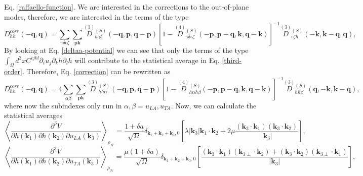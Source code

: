 Eq. \ref{raffaello-function}. We are interested in the corrections to the out-of-plane modes, therefore, we are
interested in the terms of the type
\begin{equation}
D_{hh}^{corr}(-\boldsymbol{q},\boldsymbol{q})=\sum_{\gamma\delta\epsilon\zeta}\sum_{\boldsymbol{p}\boldsymbol{k}}\overset{(3)}{D}{}^{(S)}_{h\gamma\delta}(-\boldsymbol{q},\boldsymbol{p},
\boldsymbol{q}-\boldsymbol{p})[1-\overset{(4)}{D}{}^{(S)}_{\gamma\delta\epsilon\zeta}(-\boldsymbol{p},\boldsymbol{p}-\boldsymbol{q},\boldsymbol{k},\boldsymbol{q}-\boldsymbol{k})]^{-1}\overset{(3)}{D}{}^{(S)}_{
 \epsilon\zeta h}(-\boldsymbol{k},\boldsymbol{k}-\boldsymbol{q},\boldsymbol{q}),
\end{equation}
By looking at Eq. \ref{deltaa-potential} we can see that only the terms of the type $\int_{\Omega}{d^{2}xC^{ijkl}\partial_{i}u_{j}\partial_{k}h\partial_{l}h}$ will contribute to the statistical average in
Eq. \ref{third-order}. Therefore, Eq. \ref{correction} can be rewritten as
\begin{equation}
\label{correction-simple}
D_{hh}^{corr}(-\boldsymbol{q},\boldsymbol{q})=4\sum_{\alpha\beta}\sum_{\boldsymbol{p}\boldsymbol{k}}\overset{(3)}{D}{}^{(S)}_{hh\alpha}(-\boldsymbol{q},\boldsymbol{p},\boldsymbol{q}-\boldsymbol{p})[
1-\overset{(4)}{D}{}^{(S)}_{h\alpha h\beta}(-\boldsymbol{p},\boldsymbol{p}-\boldsymbol{q},\boldsymbol{k},\boldsymbol{q}-\boldsymbol{k})]^{-1}\overset{(3)}{D}{}^{(S)}_{hh\beta}(\boldsymbol{q},-\boldsymbol{k},\boldsymbol{k}-\boldsymbol{q}),
\end{equation}
where now the subindexes only run in $\alpha,\beta=u_{LA},u_{TA}$. Now, we can calculate the statistical averages
\begin{equation}
	\left\langle\frac{\partial^{3}V}{\partial h(\boldsymbol{k}_{1})\partial h(\boldsymbol{k}_{2})\partial u_{LA}(\boldsymbol{k}_{3})}\right\rangle_{\rho_{\mathcal{H}}}=\frac{1+\delta a}{\sqrt{\Omega}}\delta_{\boldsymbol{k}_{1}+\boldsymbol{
 k}_{2}+\boldsymbol{k}_{3},0}\left[\lambda|\boldsymbol{k}_{3}|\boldsymbol{k}_{1}\cdot\boldsymbol{k}_{2}+2\mu\frac{(\boldsymbol{k}_{3}\cdot\boldsymbol{k}_{1})(\boldsymbol{k}_{3}\cdot\boldsymbol{k}_{2})}{|\boldsymbol{k}_{3}|}\right],
\end{equation}
\begin{equation}
	\left\langle\frac{\partial^{3}V}{\partial h(\boldsymbol{k}_{1})\partial h(\boldsymbol{k}_{2})\partial u_{TA}(\boldsymbol{k}_{3})}\right\rangle_{\rho_{\mathcal{H}}}=\frac{\mu(1+\delta a)}{\sqrt{\Omega}}\delta_{\boldsymbol{k}_{
 1}+\boldsymbol{k}_{2}+\boldsymbol{k}_{3},0}\left[\frac{(\boldsymbol{k}_{3}\cdot\boldsymbol{k}_{1})(\boldsymbol{k}_{3\perp}\cdot\boldsymbol{k}_{2})+(\boldsymbol{k}_{3}\cdot\boldsymbol{k}_{2})(\boldsymbol{k}_{3\perp}\cdot
 \boldsymbol{k}_{1})}{|\boldsymbol{k}_{3}|}\right],
\end{equation}
